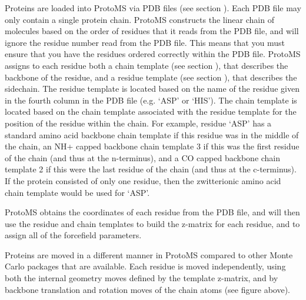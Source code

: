 \documentclass[letterpaper,10pt,english]{sphinxmanual}
\begin{document}
\ignorespaces 
{}
Proteins are loaded into ProtoMS via PDB files (see section {\hyperref[\detokenize{protoms:protpdb}]{}}). Each PDB file may only contain a single protein chain. ProtoMS constructs the linear chain of molecules based on the order of residues that it reads from the PDB file, and will ignore the residue number read from the PDB file. This means that you must ensure that you have the residues ordered correctly within the PDB file. ProtoMS assigns to each residue both a chain template (see section {\hyperref[\detokenize{protoms:temref}]{}}), that describes the backbone of the residue, and a residue template (see section {\hyperref[\detokenize{protoms:temref}]{}}), that describes the sidechain. The residue template is located based on the name of the residue given in the fourth column in the PDB file (e.g. ‘ASP’ or ‘HIS’). The chain template is located based on the chain template associated with the residue template for the position of the residue within the chain. For example, residue ‘ASP’ has a standard amino acid backbone chain template if this residue was in the middle of the chain, an NH+ capped backbone chain template 3 if this was the first residue of the chain (and thus at the n-terminus), and a CO\textendash{} capped backbone chain template 2 if this were the last residue of the chain (and thus at the c-terminus). If the protein consisted of only one residue, then the zwitterionic amino acid chain template would be used for ‘ASP’.

ProtoMS obtains the coordinates of each residue from the PDB file, and will then use the residue and chain templates to build the z-matrix for each residue, and to assign all of the forcefield parameters.

\label{\detokenize{protoms:bbatoms}}
Proteins are moved in a different manner in ProtoMS compared to other Monte Carlo packages that are available. Each residue is moved independently, using both the internal geometry moves defined by the template z-matrix, and by backbone translation and rotation moves of the chain atoms (see figure above).
\end{document}
